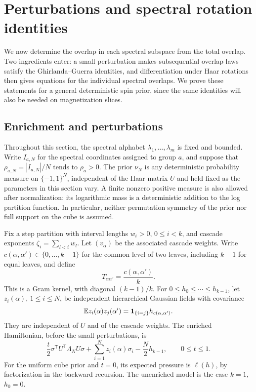 \section{Perturbations and spectral rotation identities}\label{sec:rotation}

We now determine the overlap in each spectral subspace from the total
overlap.  Two ingredients enter: a small perturbation makes subsequential
overlap laws satisfy the Ghirlanda--Guerra identities, and differentiation
under Haar rotations then gives equations for the individual spectral
overlaps.  We prove these statements for a general deterministic spin
prior, since the same identities will also be needed on magnetization
slices.

\subsection{Enrichment and perturbations}

Throughout this section, the spectral alphabet
\(\lambda_1,\ldots,\lambda_m\) is fixed and bounded.
Write \(I_{a,N}\) for the spectral coordinates assigned to group \(a\),
and suppose that \(\rho_{a,N}=|I_{a,N}|/N\) tends to \(\rho_a>0\).
The prior \(\nu_N\) is any deterministic probability measure on
\(\{-1,1\}^N\), independent of the Haar matrix \(U\) and held fixed
as the parameters in this section vary.
A finite nonzero positive measure is also allowed after normalization: its
logarithmic mass is a deterministic addition to the log partition
function.  In particular, neither permutation symmetry of the prior nor
full support on the cube is assumed.

Fix a step partition with interval lengths \(w_i>0\),
\(0\le i<k\), and cascade exponents \(\zeta_i=\sum_{l<i}w_l\).
Let \((v_\alpha)\) be the associated cascade weights.  Write
\(c(\alpha,\alpha')\in\{0,\ldots,k-1\}\) for the common level of two
leaves, including \(k-1\) for equal leaves, and define
\[
 T_{\alpha\alpha'}=\frac{c(\alpha,\alpha')}{k}.
\]
This is a Gram kernel, with diagonal \((k-1)/k\).
For \(0\le h_0\le\cdots\le h_{k-1}\), let
\(z_i(\alpha)\), \(1\le i\le N\), be independent hierarchical Gaussian
fields with covariance
\[
 \mathbb E z_i(\alpha)z_j(\alpha')
   =\mathbf 1_{\{i=j\}}h_{c(\alpha,\alpha')}.
\]
They are independent of \(U\) and of the cascade weights.  The enriched
Hamiltonian, before the small perturbations, is
\[
 \frac t2\sigma^{\mathsf T}U^{\mathsf T}\Lambda_NU\sigma
 +\sum_{i=1}^N z_i(\alpha)\sigma_i-\frac N2h_{k-1},
 \qquad 0\le t\le1.
\]
For the uniform cube prior and \(t=0\), its expected pressure is
\(\ell(h)\), by factorization in the backward recursion.  The
unenriched model is the case \(k=1\), \(h_0=0\).

